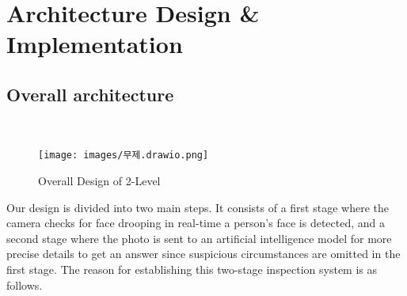 \section{\textbf{Architecture Design \& Implementation}}



\subsection{\textbf{Overall architecture}} \\

\begin{figure}[H]
    \centering
    \texttt{[image: images/무제.drawio.png]}
    \caption{Overall Design of 2-Level}
\end{figure}

Our design is divided into two main steps. It consists of a first stage where the camera checks for face drooping in real-time a person's face is detected, and a second stage where the photo is sent to an artificial intelligence model for more precise details to get an answer since suspicious circumstances are omitted in the first stage. The reason for establishing this two-stage inspection system is as follows.

